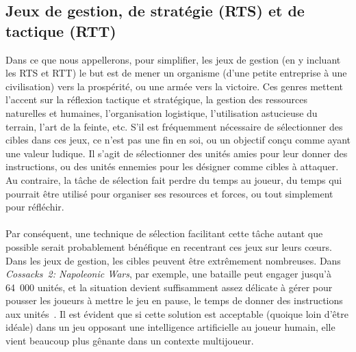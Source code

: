 	\subsection{Jeux de gestion, de stratégie (RTS) et de tactique (RTT)}
	Dans ce que nous appellerons, pour simplifier, les jeux de gestion (en y incluant les RTS et RTT) le but est de mener un organisme (d'une petite entreprise à une civilisation) vers la prospérité, ou une armée vers la victoire. Ces genres mettent l'accent sur la réflexion tactique et stratégique, la gestion des ressources naturelles et humaines, l'organisation logistique, l'utilisation astucieuse du terrain, l'art de la feinte, etc. S'il est fréquemment nécessaire de sélectionner des cibles dans ces jeux, ce n'est pas une fin en soi, ou un objectif conçu comme ayant une valeur ludique. Il s'agit de sélectionner des unités amies pour leur donner des instructions, ou des unités ennemies pour les désigner comme cibles à attaquer. Au contraire, la tâche de sélection fait perdre du temps au joueur, du temps qui pourrait être utilisé pour organiser ses resources et forces, ou tout simplement pour réfléchir.
	
	\paragraph{}
	Par conséquent, une technique de sélection facilitant cette tâche autant que possible serait probablement bénéfique en recentrant ces jeux sur leurs cœurs. Dans les jeux de gestion, les cibles peuvent être extrêmement nombreuses. Dans \emph{Cossacks~2: Napoleonic Wars}, par exemple, une bataille peut engager jusqu'à 64~000 unités, et la situation devient suffisamment assez délicate à gérer pour pousser les joueurs à mettre le jeu en pause, le temps de donner des instructions aux unités~\cite{cossacks2}. Il est évident que si cette solution est acceptable (quoique loin d'être idéale) dans un jeu opposant une intelligence artificielle au joueur humain, elle vient beaucoup plus gênante dans un contexte multijoueur.
	
